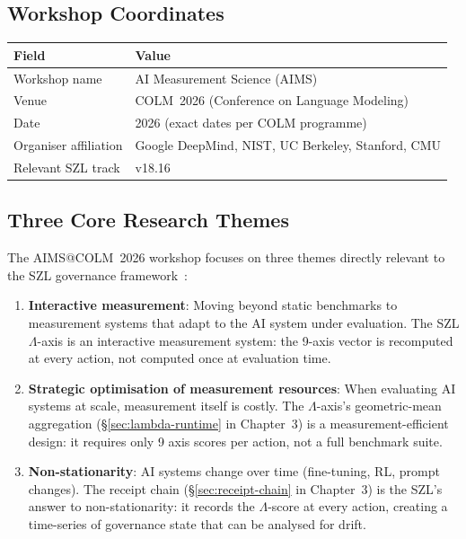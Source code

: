 \subsection{Workshop Coordinates}
\label{ssec:aims-coords}

\begin{center}
\begin{tabular}{ll}
\textbf{Field} & \textbf{Value} \\
\hline
Workshop name & AI Measurement Science (AIMS) \\
Venue & COLM~2026 (Conference on Language Modeling) \\
Date & 2026 (exact dates per COLM programme) \\
Organiser affiliation & Google DeepMind, NIST, UC Berkeley, Stanford, CMU \\
Relevant SZL track & v18.16 \\
\end{tabular}
\end{center}

\subsection{Three Core Research Themes}
\label{ssec:aims-themes}

The AIMS@COLM~2026 workshop focuses on three themes directly relevant to
the SZL governance framework~\cite{aims_colm26_deep}:

\begin{enumerate}
  \item \textbf{Interactive measurement}: Moving beyond static benchmarks to
    measurement systems that adapt to the AI system under evaluation.  The
    SZL $\Lambda$-axis is an interactive measurement system: the 9-axis
    vector is recomputed at every action, not computed once at evaluation
    time.
  \item \textbf{Strategic optimisation of measurement resources}: When
    evaluating AI systems at scale, measurement itself is costly.  The
    $\Lambda$-axis's geometric-mean aggregation (\S\ref{sec:lambda-runtime}
    in Chapter~3) is a measurement-efficient design: it requires only 9 axis
    scores per action, not a full benchmark suite.
  \item \textbf{Non-stationarity}: AI systems change over time (fine-tuning,
    RL, prompt changes).  The receipt chain (\S\ref{sec:receipt-chain}
    in Chapter~3) is the SZL's answer to non-stationarity: it records the
    $\Lambda$-score at every action, creating a time-series of governance
    state that can be analysed for drift.
\end{enumerate}

